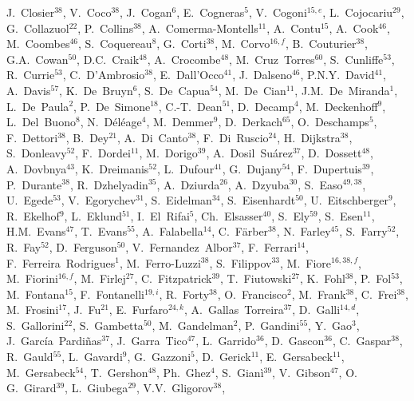 \documentclass[12pt,a4paper]{article}
\begin{document}
\begin{flushleft}
J.~Closier$^{38}$, 
V.~Coco$^{38}$, 
J.~Cogan$^{6}$, 
E.~Cogneras$^{5}$, 
V.~Cogoni$^{15,e}$, 
L.~Cojocariu$^{29}$, 
G.~Collazuol$^{22}$, 
P.~Collins$^{38}$, 
A.~Comerma-Montells$^{11}$, 
A.~Contu$^{15}$, 
A.~Cook$^{46}$, 
M.~Coombes$^{46}$, 
S.~Coquereau$^{8}$, 
G.~Corti$^{38}$, 
M.~Corvo$^{16,f}$, 
B.~Couturier$^{38}$, 
G.A.~Cowan$^{50}$, 
D.C.~Craik$^{48}$, 
A.~Crocombe$^{48}$, 
M.~Cruz~Torres$^{60}$, 
S.~Cunliffe$^{53}$, 
R.~Currie$^{53}$, 
C.~D'Ambrosio$^{38}$, 
E.~Dall'Occo$^{41}$, 
J.~Dalseno$^{46}$, 
P.N.Y.~David$^{41}$, 
A.~Davis$^{57}$, 
K.~De~Bruyn$^{6}$, 
S.~De~Capua$^{54}$, 
M.~De~Cian$^{11}$, 
J.M.~De~Miranda$^{1}$, 
L.~De~Paula$^{2}$, 
P.~De~Simone$^{18}$, 
C.-T.~Dean$^{51}$, 
D.~Decamp$^{4}$, 
M.~Deckenhoff$^{9}$, 
L.~Del~Buono$^{8}$, 
N.~D\'{e}l\'{e}age$^{4}$, 
M.~Demmer$^{9}$, 
D.~Derkach$^{65}$, 
O.~Deschamps$^{5}$, 
F.~Dettori$^{38}$, 
B.~Dey$^{21}$, 
A.~Di~Canto$^{38}$, 
F.~Di~Ruscio$^{24}$, 
H.~Dijkstra$^{38}$, 
S.~Donleavy$^{52}$, 
F.~Dordei$^{11}$, 
M.~Dorigo$^{39}$, 
A.~Dosil~Su\'{a}rez$^{37}$, 
D.~Dossett$^{48}$, 
A.~Dovbnya$^{43}$, 
K.~Dreimanis$^{52}$, 
L.~Dufour$^{41}$, 
G.~Dujany$^{54}$, 
F.~Dupertuis$^{39}$, 
P.~Durante$^{38}$, 
R.~Dzhelyadin$^{35}$, 
A.~Dziurda$^{26}$, 
A.~Dzyuba$^{30}$, 
S.~Easo$^{49,38}$, 
U.~Egede$^{53}$, 
V.~Egorychev$^{31}$, 
S.~Eidelman$^{34}$, 
S.~Eisenhardt$^{50}$, 
U.~Eitschberger$^{9}$, 
R.~Ekelhof$^{9}$, 
L.~Eklund$^{51}$, 
I.~El~Rifai$^{5}$, 
Ch.~Elsasser$^{40}$, 
S.~Ely$^{59}$, 
S.~Esen$^{11}$, 
H.M.~Evans$^{47}$, 
T.~Evans$^{55}$, 
A.~Falabella$^{14}$, 
C.~F\"{a}rber$^{38}$, 
N.~Farley$^{45}$, 
S.~Farry$^{52}$, 
R.~Fay$^{52}$, 
D.~Ferguson$^{50}$, 
V.~Fernandez~Albor$^{37}$, 
F.~Ferrari$^{14}$, 
F.~Ferreira~Rodrigues$^{1}$, 
M.~Ferro-Luzzi$^{38}$, 
S.~Filippov$^{33}$, 
M.~Fiore$^{16,38,f}$, 
M.~Fiorini$^{16,f}$, 
M.~Firlej$^{27}$, 
C.~Fitzpatrick$^{39}$, 
T.~Fiutowski$^{27}$, 
K.~Fohl$^{38}$, 
P.~Fol$^{53}$, 
M.~Fontana$^{15}$, 
F.~Fontanelli$^{19,i}$, 
R.~Forty$^{38}$, 
O.~Francisco$^{2}$, 
M.~Frank$^{38}$, 
C.~Frei$^{38}$, 
M.~Frosini$^{17}$, 
J.~Fu$^{21}$, 
E.~Furfaro$^{24,k}$, 
A.~Gallas~Torreira$^{37}$, 
D.~Galli$^{14,d}$, 
S.~Gallorini$^{22}$, 
S.~Gambetta$^{50}$, 
M.~Gandelman$^{2}$, 
P.~Gandini$^{55}$, 
Y.~Gao$^{3}$, 
J.~Garc\'{i}a~Pardi\~{n}as$^{37}$, 
J.~Garra~Tico$^{47}$, 
L.~Garrido$^{36}$, 
D.~Gascon$^{36}$, 
C.~Gaspar$^{38}$, 
R.~Gauld$^{55}$, 
L.~Gavardi$^{9}$, 
G.~Gazzoni$^{5}$, 
D.~Gerick$^{11}$, 
E.~Gersabeck$^{11}$, 
M.~Gersabeck$^{54}$, 
T.~Gershon$^{48}$, 
Ph.~Ghez$^{4}$, 
S.~Gian\`{i}$^{39}$, 
V.~Gibson$^{47}$, 
O. G.~Girard$^{39}$, 
L.~Giubega$^{29}$, 
V.V.~Gligorov$^{38}$, 

\end{flushleft}
\end{document}
